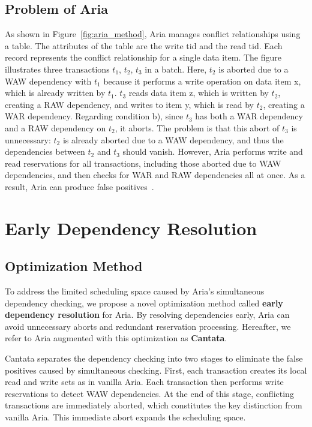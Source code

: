 \documentclass[english,preprint,JIP]{ipsj}
\begin{document}
\subsection{Problem of Aria}
\label{sec:problem_aria}
As shown in Figure~\ref{fig:aria_method}, Aria manages conflict relationships using a table. 
The attributes of the table are the write tid and the read tid. Each record represents the conflict relationship for a single data item.
The figure illustrates three transactions $t_1$, $t_2$, $t_3$ in a batch. 
%
Here, $t_2$ is aborted due to a WAW dependency with $t_1$ because it performs a write operation on data item x, which is already written by $t_1$.
%
$t_3$ reads data item z, which is written by $t_2$, creating a RAW dependency, and writes to item y, which is read by $t_2$, creating a WAR dependency. Regarding condition b), since $t_3$ has both a WAR dependency and a RAW dependency on $t_2$, it aborts. 
%
The problem is that this abort of $t_3$ is unnecessary: $t_2$ is already aborted due to a WAW dependency, and thus the dependencies between $t_2$ and $t_3$ should vanish. However, Aria performs write and read reservations for all transactions, including those aborted due to WAW dependencies, and then checks for WAR and RAW dependencies all at once. As a result, Aria can produce false positives~\cite{weikum2001}.


\section{Early Dependency Resolution}
\subsection{Optimization Method}
To address the limited scheduling space caused by Aria's simultaneous dependency checking, we propose a novel optimization method called \textbf{early dependency resolution} for Aria. 
%
By resolving dependencies early, Aria can avoid unnecessary aborts and redundant reservation processing.
%
Hereafter, we refer to Aria augmented with this optimization as \textbf{Cantata}.
%

Cantata separates the dependency checking into two stages to eliminate the false positives caused by simultaneous checking. 
%
First, each transaction creates its local read and write sets as in vanilla Aria. 
Each transaction then performs write reservations to detect WAW dependencies. 
%
At the end of this stage, conflicting transactions are immediately aborted, which constitutes the key distinction from vanilla Aria. This immediate abort expands the scheduling space.
%
\end{document}
